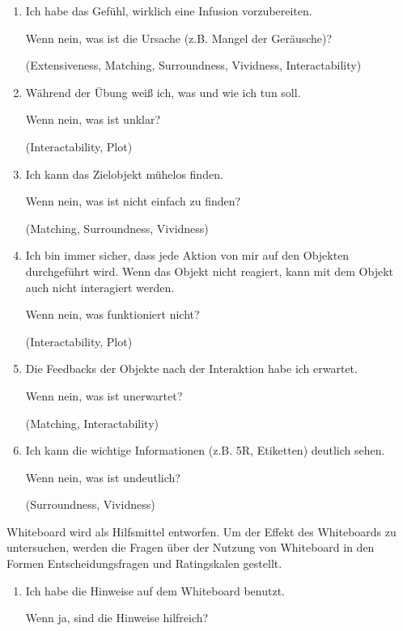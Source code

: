 \begin{enumerate}
    \item Ich habe das Gefühl, wirklich eine Infusion vorzubereiten.
    
    Wenn nein, was ist die Ursache (z.B. Mangel der Geräusche)?
    
    (Extensiveness, Matching, Surroundness, Vividness, Interactability)
    
    \item Während der Übung weiß ich, was und wie ich tun soll.
    
    Wenn nein, was ist unklar?
    
    (Interactability, Plot)
    
    \item Ich kann das Zielobjekt mühelos finden.
    
    Wenn nein, was ist nicht einfach zu finden?
    
    (Matching, Surroundness, Vividness)
    
    \item Ich bin immer sicher, dass jede Aktion von mir auf den Objekten durchgeführt wird. Wenn das Objekt nicht reagiert, kann mit dem Objekt auch nicht interagiert werden.
    
    Wenn nein, was funktioniert nicht?
    
    (Interactability, Plot)
    
    \item  Die Feedbacks der Objekte nach der Interaktion habe ich erwartet. 
    
    Wenn nein, was ist unerwartet?
    
    (Matching, Interactability)
    
    \item Ich kann die wichtige Informationen (z.B. 5R, Etiketten) deutlich sehen.
    
    Wenn nein, was ist undeutlich?
    
    (Surroundness, Vividness)
    
\end{enumerate}

Whiteboard wird als Hilfsmittel entworfen. Um der Effekt des Whiteboards zu untersuchen, werden die Fragen über der Nutzung von Whiteboard in den Formen Entscheidungsfragen und Ratingskalen gestellt.

\begin{enumerate}
    \item Ich habe die Hinweise auf dem Whiteboard benutzt.
    
    Wenn ja, sind die Hinweise hilfreich?
\end{enumerate}

